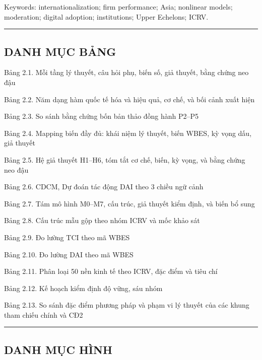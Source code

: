 \documentclass[
  a4paper,
  13pt]{extreport}
\begin{document}
Keywords: internationalization; firm performance; Asia; nonlinear
models; moderation; digital adoption; institutions; Upper Echelons;
ICRV.

\begin{center}\rule{0.5\linewidth}{0.5pt}\end{center}

\renewcommand{\contentsname}{MỤC LỤC}
\setcounter{tocdepth}{3}
\tableofcontents

\hypertarget{danh-mux1ee5c-bux1ea3ng}{%
\subsection{DANH MỤC BẢNG}\label{danh-mux1ee5c-bux1ea3ng}}

Bảng 2.1. Mỗi tầng lý thuyết, câu hỏi phụ, biến số, giả thuyết, bằng
chứng neo đậu

Bảng 2.2. Năm dạng hàm quốc tế hóa và hiệu quả, cơ chế, và bối cảnh xuất
hiện

Bảng 2.3. So sánh bằng chứng bốn bản thảo đồng hành P2--P5

Bảng 2.4. Mapping biến đầy đủ: khái niệm lý thuyết, biến WBES, kỳ vọng
dấu, giả thuyết

Bảng 2.5. Hệ giả thuyết H1--H6, tóm tắt cơ chế, biến, kỳ vọng, và bằng
chứng neo đậu

Bảng 2.6. CDCM, Dự đoán tác động DAI theo 3 chiều ngữ cảnh

Bảng 2.7. Tám mô hình M0--M7, cấu trúc, giả thuyết kiểm định, và biến bổ
sung

Bảng 2.8. Cấu trúc mẫu gộp theo nhóm ICRV và mốc khảo sát

Bảng 2.9. Đo lường TCI theo mã WBES

Bảng 2.10. Đo lường DAI theo mã WBES

Bảng 2.11. Phân loại 50 nền kinh tế theo ICRV, đặc điểm và tiêu chí

Bảng 2.12. Kế hoạch kiểm định độ vững, sáu nhóm

Bảng 2.13. So sánh đặc điểm phương pháp và phạm vi lý thuyết của các
khung tham chiếu chính và CĐ2

\begin{center}\rule{0.5\linewidth}{0.5pt}\end{center}

\hypertarget{danh-mux1ee5c-huxecnh}{%
\subsection{DANH MỤC HÌNH}\label{danh-mux1ee5c-huxecnh}}
\end{document}

